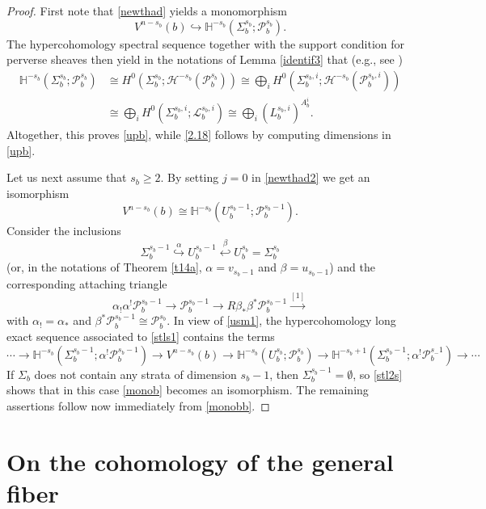 \documentclass[12pt,leqno,twoside]{amsart}
\theoremstyle{remark}
\theoremstyle{remark}
\theoremstyle{definition}
\theoremstyle{remark}
\theoremstyle{remark}
\theoremstyle{remark}
\numberwithin{equation}{section}  %
\def\be{\begin{equation}}
\def\ee{\end{equation}}
\newcommand{\cH}{\mathcal{H}}
\newcommand{\cP}{\mathcal{P}}
\newcommand{\bH}{\mathbb{H}}
\begin{document}
\begin{proof}
First note that \eqref{newthad} yields a monomorphism
\be\label{monob}
V^{n-s_b}(b) \hookrightarrow \bH^{-s_b}(\Sigma_b^{s_b};\cP_b^{s_b}).
\ee
The hypercohomology spectral sequence together with the support condition for perverse sheaves then yield in the notations of Lemma \ref{identif3} that (e.g., see \cite[Proposition 5.2.20]{Di})
\be\label{monobb} 
\begin{split}
\bH^{-s_b}(\Sigma_b^{s_b};\cP_b^{s_b}) &\cong H^0(\Sigma_b^{s_b};\cH^{-s_b}(\cP_b^{s_b}))
\cong \bigoplus_i H^{0}(\Sigma_b^{s_b,i};\cH^{-s_b}(\cP_b^{s_b,i})) \\
& \cong \bigoplus_i H^{0}(\Sigma_b^{s_b,i};\mathcal{L}_b^{s_b,i}) \cong \bigoplus_i \left({L}_b^{s_b,i}\right)^{A_b^i}.
\end{split}
\ee
Altogether, this proves \eqref{upb}, while \eqref{2.18} follows by computing dimensions in \eqref{upb}.

Let us next assume that $s_b\geq 2$. By setting $j=0$ in \eqref{newthad2} we get an isomorphism
\be\label{usm1}
V^{n-s_b}(b) \cong \bH^{-s_b}(U_{b}^{s_b-1};\cP_b^{s_b-1}).
\ee
Consider the inclusions
$$\Sigma_b^{s_b-1} \overset{\alpha}{\hookrightarrow} U_b^{s_b-1} \overset{\beta}{\hookleftarrow} U_b^{s_b}=\Sigma_b^{s_b}$$
(or, in the notations of Theorem \ref{t14a}, $\alpha=v_{s_b-1}$ and $\beta=u_{s_b-1}$)
and the corresponding attaching triangle 
\be\label{stls1}{\alpha}_!{\alpha}^!\cP_b^{s_b-1} \to \cP_b^{s_b-1} \to R{\beta}_*{\beta}^*\cP_b^{s_b-1} \overset{[1]}{\to}\ee
with ${\alpha}_!={\alpha}_*$ and ${\beta}^*\cP_b^{s_b-1} \cong \cP_b^{s_b}$. In view of \eqref{usm1}, the hypercohomology long exact sequence associated to \eqref{stls1} contains the terms
\be\label{stl2s} \cdots \to \bH^{-s_b}(\Sigma_b^{s_b-1}; {\alpha}^!\cP_b^{s_b-1}) \to V^{n-s_b}(b)  \to   \bH^{-s_b}(U_b^{s_b};\cP_b^{s_b}) \to \bH^{-s_b+1}(\Sigma_b^{s_b-1}; {\alpha}^!\cP_b^{s_-1}) \to \cdots\ee
If $\Sigma_b$ does not contain any strata of dimension $s_b-1$, then $\Sigma_b^{s_b-1}=\emptyset$, so \eqref{stl2s} shows that in this case \eqref{monob} becomes an isomorphism. The remaining assertions follow now immediately from \eqref{monobb}.
\end{proof}




\section{On the cohomology of the general fiber}\label{genf}
\end{document}
